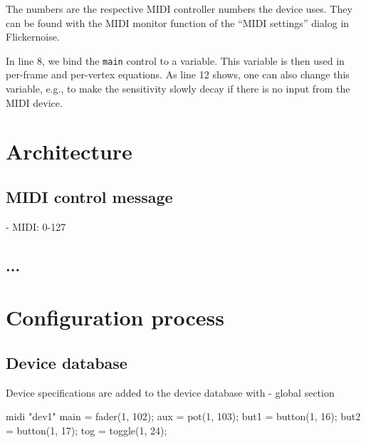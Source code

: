 \documentclass[11pt,a4paper]{article}
\begin{document}
The numbers are the respective MIDI controller numbers the device uses.
They can be found with the MIDI monitor function of the ``MIDI settings''
dialog in Flickernoise.

In line 8, we bind the {\tt main} control to a variable. This variable is
then used in per-frame and per-vertex equations. As line 12 shows, one
can also change this variable, e.g., to make the sensitivity slowly decay
if there is no input from the MIDI device.




\section{Architecture}




\subsection{MIDI control message}

- MIDI: 0-127




\subsection{...}



\section{Configuration process}



\subsection{Device database}

Device specifications are added to the device database with 
- global section

\begin{listing}{1}
midi "dev1" {
	main = fader(1, 102);
	aux = pot(1, 103);
	but1 = button(1, 16);
	but2 = button(1, 17);
	tog = toggle(1, 24);
}
\end{listing}
\end{document}
